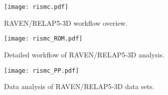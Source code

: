 \begin{figure}
    \centering
    \texttt{[image: rismc.pdf]}
    \caption{RAVEN/RELAP5-3D workflow overiew.}
    \label{fig:rismc}
\end{figure} 

\begin{figure}
    \centering
    \texttt{[image: rismc\_ROM.pdf]}
    \caption{Detailed workflow of RAVEN/RELAP5-3D analysis.}
    \label{fig:rismc_det}
\end{figure} 

\begin{figure}
    \centering
    \texttt{[image: rismc\_PP.pdf]}
    \caption{Data analysis of RAVEN/RELAP5-3D data sets.}
    \label{fig:rismc_PP}
\end{figure} 




